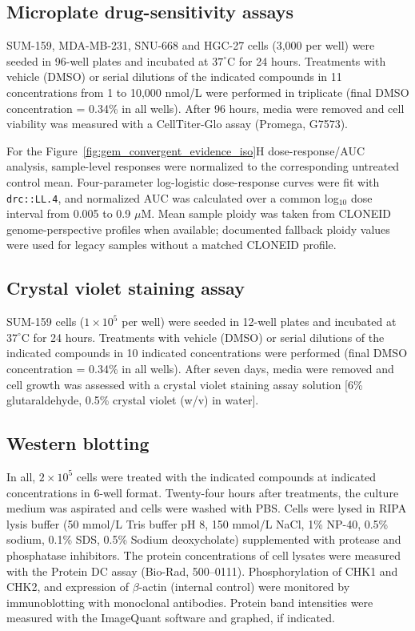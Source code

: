 \documentclass[11pt,notitlepage]{article}
\begin{document}
\subsection{Microplate drug-sensitivity assays} \label{sec:methods-microplate-drug-sensitivity}
SUM-159, MDA-MB-231, SNU-668 and HGC-27 cells (3,000 per well) were seeded in 96-well plates and incubated at $37^\circ$C for 24 hours. Treatments with vehicle (DMSO) or serial dilutions of the indicated compounds in 11 concentrations from 1 to 10,000 nmol/L were performed in triplicate (final DMSO concentration = 0.34\% in all wells). After 96 hours, media were removed and cell viability was measured with a CellTiter-Glo assay (Promega, G7573).
  
  For the Figure~\ref{fig:gem_convergent_evidence_iso}H dose-response/AUC analysis, sample-level responses were normalized to the corresponding
  untreated control mean. Four-parameter log-logistic dose-response curves were fit with \texttt{drc::LL.4}, and normalized AUC was calculated over a
  common log$_{10}$ dose interval from 0.005 to 0.9 $\mu$M. Mean sample ploidy was taken from CLONEID genome-perspective profiles when available;
  documented fallback ploidy values were used for legacy samples without a matched CLONEID profile.


\subsection{Crystal violet staining assay}
SUM-159 cells ($1 \times 10^5$ per well) were seeded in 12-well plates and incubated at $37^\circ$C for 24 hours. Treatments with vehicle (DMSO) or serial dilutions of the indicated compounds in 10 indicated concentrations were performed (final DMSO concentration = 0.34\% in all wells). After seven days, media were removed and cell growth was assessed with a crystal violet staining assay solution [6\% glutaraldehyde, 0.5\% crystal violet (w/v) in water].

\subsection{Western blotting}
In all, $2 \times 10^5$ cells were treated with the indicated compounds at indicated concentrations in 6-well format. Twenty-four hours after treatments, the culture medium was aspirated and cells were washed with PBS. Cells were lysed in RIPA lysis buffer (50 mmol/L Tris buffer pH 8, 150 mmol/L NaCl, 1\% NP-40, 0.5\% sodium, 0.1\% SDS, 0.5\% Sodium deoxycholate) supplemented with protease and phosphatase inhibitors. The protein concentrations of cell lysates were measured with the Protein DC assay (Bio-Rad, 500--0111). Phosphorylation of CHK1 and CHK2, and expression of $\beta$-actin (internal control) were monitored by immunoblotting with monoclonal antibodies. Protein band intensities were measured with the ImageQuant software and graphed, if indicated.
\end{document}
